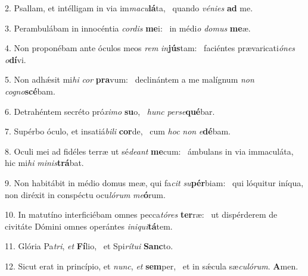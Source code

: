 2. Psallam, et intélligam in via im\textit{ma}\textit{cu}\textbf{lá}ta, \ast\  quando \textit{vé}\textit{ni}\textit{es} \textbf{ad} me.\

3. Perambulábam in innocéntia \textit{cor}\textit{dis} \textbf{me}i: \ast\  in médi\textit{o} \textit{do}\textit{mus} \textbf{me}æ.\

4. Non proponébam ante óculos meos \textit{rem} \textit{in}\textbf{jús}tam: \ast\  faciéntes prævaricati\textit{ó}\textit{nes} \textit{o}\textbf{dí}vi.\

5. Non adhǽsit mi\textit{hi} \textit{cor} \textbf{pra}vum: \ast\  declinántem a me malígnum \textit{non} \textit{co}\textit{gno}\textbf{scé}bam.\

6. Detrahéntem secréto pró\textit{xi}\textit{mo} \textbf{su}o, \ast\  \textit{hunc} \textit{per}\textit{se}\textbf{qué}bar.\

7. Supérbo óculo, et insatiá\textit{bi}\textit{li} \textbf{cor}de, \ast\  cum \textit{hoc} \textit{non} \textit{e}\textbf{dé}bam.\

8. Oculi mei ad fidéles terræ ut sé\textit{de}\textit{ant} \textbf{me}cum: \ast\  ámbulans in via immaculáta, hic mi\textit{hi} \textit{mi}\textit{nis}\textbf{trá}bat.\

9. Non habitábit in médio domus meæ, qui fa\textit{cit} \textit{su}\textbf{pér}biam: \ast\  qui lóquitur iníqua, non diréxit in conspéctu ocu\textit{ló}\textit{rum} \textit{me}\textbf{ó}rum.\

10. In matutíno interficiébam omnes pecca\textit{tó}\textit{res} \textbf{ter}ræ: \ast\  ut dispérderem de civitáte Dómini omnes operántes \textit{in}\textit{i}\textit{qui}\textbf{tá}tem.\

11. Glória Pa\textit{tri}, \textit{et} \textbf{Fí}lio, \ast\  et Spi\textit{rí}\textit{tu}\textit{i} \textbf{Sanc}to.\

12. Sicut erat in princípio, et \textit{nunc}, \textit{et} \textbf{sem}per, \ast\  et in sǽcula sæ\textit{cu}\textit{ló}\textit{rum}. \textbf{A}men.\

